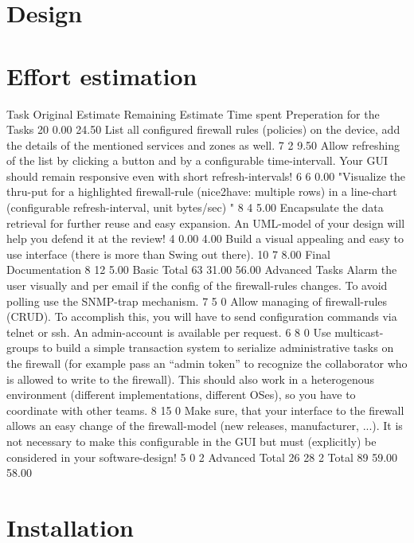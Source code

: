\documentclass[11pt, a4paper]{article}
\begin{document}
\section{Design}
 
\section{Effort estimation}

Task	Original Estimate 	Remaining Estimate	Time spent
Preperation for the Tasks	20	0.00	24.50
List all configured firewall rules (policies) on the device, add the details of the mentioned services and zones as well.	7	2	9.50
Allow refreshing of the list by clicking a button and by a configurable time-intervall. Your GUI should remain responsive even with short refresh-intervals!	6	6	0.00
"Visualize the thru-put for a highlighted firewall-rule (nice2have: multiple rows) in a line-chart (configurable refresh-interval, unit bytes/sec)
"	8	4	5.00
Encapsulate the data retrieval for further reuse and easy expansion. An UML-model of your design will help you defend it at the review!	4	0.00	4.00
Build a visual appealing and easy to use interface (there is more than Swing out there).	10	7	8.00
Final Documentation 	8	12	5.00
Basic Total	63	31.00	56.00
Advanced Tasks			
Alarm the user visually and per email if the config of the firewall-rules changes. To avoid polling use the SNMP-trap mechanism.	7	5	0
Allow managing of firewall-rules (CRUD). To accomplish this, you will have to send configuration commands via telnet or ssh. An admin-account is available per request.	6	8	0
Use multicast-groups to build a simple transaction system to serialize administrative tasks on the firewall (for example pass an “admin token” to recognize the collaborator who is allowed to write to the firewall). This should also work in a heterogenous environment (different implementations, different OSes), so you have to coordinate with other teams.	8	15	0
Make sure, that your interface to the firewall allows an easy change of the firewall-model (new releases, manufacturer, ...). It is not necessary to make this configurable in the GUI but must (explicitly) be considered in your software-design!	5	0	2
Advanced Total	26	28	2
Total	89	59.00	58.00

\section{Installation}
\end{document}
